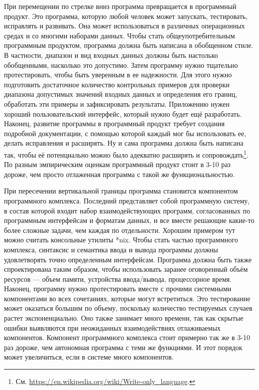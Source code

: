 \documentclass{../../text-style}
\begin{document}
При перемещении по стрелке вниз программа превращается в программный продукт. Это программа, которую любой человек может запускать, тестировать, исправлять и развивать. Она может использоваться в различных операционных средах и со многими наборами данных. Чтобы стать общеупотребительным программным продуктом, программа должна быть написана в обобщенном стиле. В частности, диапазон и вид входных данных должны быть настолько обобщенными, насколько это допустимо. Затем программу нужно тщательно протестировать, чтобы быть уверенным в ее надежности. Для этого нужно подготовить достаточное количество контрольных примеров для проверки диапазона допустимых значений входных данных и определения его границ, обработать эти примеры и зафиксировать результаты. Приложению нужен хороший пользовательский интерфейс, который нужно будет ещё разработать. Наконец, развитие программы в программный продукт требует создания подробной документации, с помощью которой каждый мог бы использовать ее, делать исправления и расширять. Ну и сама программа должна быть написана так, чтобы её потенциально можно было адекватно расширять и сопровождать\footnote{См. \url{https://en.wikipedia.org/wiki/Write-only_language}.}. По разным эмпирическим оценкам программный продукт стоит в 3-10 раз дороже, чем просто отлаженная программа с такой же функциональностью. 

При пересечении вертикальной границы программа становится компонентом программного комплекса. Последний представляет собой программную систему, в состав которой входит набор взаимодействующих программ, согласованных по программным интерфейсам и форматам данных, и все вместе решающие какие-то более сложные задачи, чем каждая по отдельности. Хорошим примером тут можно считать консольные утилиты *nix. Чтобы стать частью программного комплекса, синтаксис и семантика ввода и вывода программы должны удовлетворять точно определенным интерфейсам. Программа должна быть также спроектирована таким образом, чтобы использовать заранее оговоренный объём ресурсов --- объем памяти, устройства ввода/вывода, процессорное время. Наконец, программу нужно протестировать вместе с прочими системными компонентами во всех сочетаниях, которые могут встретиться. Это тестирование может оказаться большим по объему, поскольку количество тестируемых случаев растет экспоненциально. Оно также занимает много времени, так как скрытые ошибки выявляются при неожиданных взаимодействиях отлаживаемых компонентов. Компонент программного комплекса стоит примерно так же в 3-10 раз дороже, чем автономная программа с теми же функциями. И этот порядок может увеличиться, если в системе много компонентов. 
\end{document}
